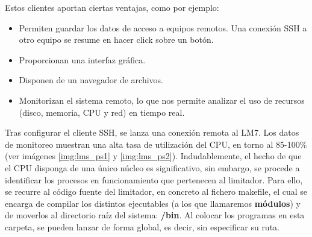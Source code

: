 Estos clientes aportan ciertas ventajas, como por ejemplo:

\begin{itemize}
    \item Permiten guardar los datos de acceso a equipos remotos. Una conexión \acrshort{SSH} a otro equipo se resume en hacer click sobre un botón.
    \item Proporcionan una interfaz gráfica.
    \item Disponen de un navegador de archivos.
    \item Monitorizan el sistema remoto, lo que nos permite analizar el uso de recursos (disco, memoria, \acrshort{CPU} y red) en tiempo real.
\end{itemize}

Tras configurar el cliente \acrshort{SSH}, se lanza una conexión remota al \gls{LM7}. Los datos de monitoreo muestran una alta tasa de utilización del \acrshort{CPU}, en torno al 85-100\% (ver imágenes \ref{img:lms_ps1} y \ref{img:lms_ps2}). Indudablemente, el hecho de que el \acrshort{CPU} disponga de una único núcleo es significativo, sin embargo, se procede a identificar los procesos en funcionamiento que pertenecen al limitador. Para ello, se recurre al código fuente del limitador, en concreto al fichero \gls{makefile}, el cual se encarga de compilar los distintos ejecutables (a los que llamaremos \textbf{módulos}) y de moverlos al directorio raíz del sistema: \textbf{/bin}. Al colocar los programas en esta carpeta, se pueden lanzar de forma global, es decir, sin especificar su ruta.

